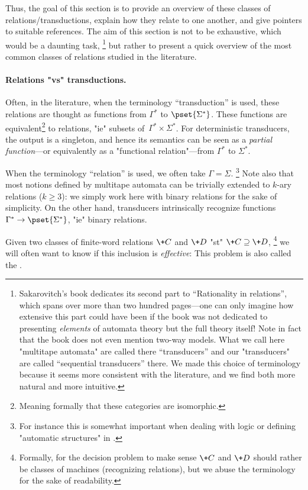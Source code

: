 Thus, the goal of this section is to provide an overview of these classes of relations/transductions, explain how they relate to one another, and give pointers to suitable references.
The aim of this section is not to be exhaustive, which would be a daunting task,%
\footnote{Sakarovitch's book \cite{Sakarovitch2009Elements}
dedicates its second part to ``Rationality in relations'', which spans over more than two hundred pages---one can only imagine how extensive this part could have been if the book was not
dedicated to presenting \emph{elements} of automata theory but the full theory itself!
Note in fact that the book does not even mention two-way models.
What we call here "multitape automata" are called there ``transducers''
and our "transducers" are called ``sequential transducers'' there.
We made this choice of terminology because it seems more consistent with
the literature, and we find both more natural and more intuitive.}
but rather to present a quick overview of the most common classes of relations
studied in the literature.

\paragraph*{Relations "vs" transductions.}
Often, in the literature, when the terminology ``transduction'' is used,
these relations are thought as functions from $\Gamma^*$ to $\pset{\Sigma^*}$.
These functions are equivalent\footnote{Meaning formally that these categories are isomorphic.}
to relations, "ie" subsets of~$\Gamma^* \times \Sigma^*$.
For deterministic transducers, the output is a singleton, and hence its semantics can be seen
as a \emph{partial function}---or equivalently as a "functional relation"---from $\Gamma^*$ to $\Sigma^*$.

When the terminology ``relation'' is used,
we often take $\Gamma = \Sigma$.%
\footnote{For instance this is somewhat important when
dealing with logic or defining "automatic structures"
in .}
Note also that most notions defined by multitape automata
can be trivially extended to $k$-ary relations ($k \geq 3$):
we simply work here with binary relations for the sake of simplicity.
On the other hand, transducers intrinsically recognize functions $\Gamma^* \to \pset{\Sigma^*}$,
"ie" binary relations.

Given two classes of finite-word relations $\+C$ and $\+D$ "st" $\+C \supseteq \+D$,%
\footnote{Formally, for the decision problem to make sense $\+C$ and $\+D$ should rather be
classes of machines (recognizing relations),
but we abuse the terminology for the sake of readability.}
we will often want to know if this inclusion is \emph{effective}:
This problem is also called the .

